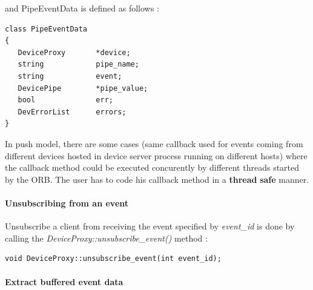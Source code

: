 and PipeEventData is defined as follows :
\begin{verbatim}
class PipeEventData 
{
   DeviceProxy       *device;
   string            pipe_name;
   string            event;
   DevicePipe        *pipe_value;
   bool              err;
   DevErrorList      errors;
}
\end{verbatim}
In push model, there are some cases (same callback used for events
coming from different devices hosted in device server process running
on different hosts) where the callback method could be executed concurently
by different threads started by the ORB. The user has to code his
callback method in a \textbf{thread} \textbf{safe}
manner.


\paragraph{Unsubscribing from an event }

Unsubscribe a client from receiving the event specified by \emph{event\_id}
is done by calling the \emph{DeviceProxy::unsubscribe\_event()}
method :
\begin{verbatim}
void DeviceProxy::unsubscribe_event(int event_id);

\end{verbatim}

\paragraph{Extract buffered event data}

